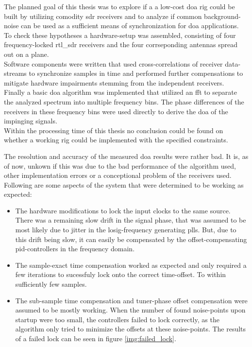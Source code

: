The planned goal of this thesis was to explore if
a a low-cost \gls{doa} rig could be built by
utilizing comodity \gls{sdr} receivers
and to analyze if common background-noise
can be used as a sufficient means of
synchronization for \gls{doa} applications. \\

To check these hypotheses a hardware-setup was
assembled, consisting of four frequency-locked
rtl\_sdr receivers and the four corrseponding
antennas spread out on a plane. \\

Software components were written that used
cross-correlations of receiver data-streams
to synchronize samples in time and
performed further compensations to
mitigate hardware impairments stemming from
the independent receivers. \\

Finally a basic \gls{doa} algorithm was implemented
that utilized an \gls{fft} to separate the
analyzed spectrum into multiple frequency bins.
The phase differences of the receivers in these
frequency bins were used directly to derive
the \acrlong{doa} of the impinging signals. \\

Within the processing time of this thesis no
conclusion could be found on whether a
working rig could be implemented with the
specified constraints.

The resolution and accuracy of the measured
\gls{doa} results were rather bad.
It is, as of now, unkown if this was due to
the bad performance of the algorithm used,
other implementation errors or a conceptional
problem of the receivers used. \\

Following are some aspects of the system that
were determined to be working as expected:

\begin{itemize}
  \item
    The hardware modifications to lock the input clocks
    to the same source. \\
    There was a remaining slow drift in
    the signal phase, that was assumed to be most likely due to jitter
    in the \acrshort{losig}-frequency generating \glspl{pll}.
    But, due to this drift being slow, it can easily be compensated by
    the offset-compensating \acrshort{pid}-controllers in the frequency domain.

  \item
    The sample-exact time compensation worked as expected and
    only required a few iterations to sucessfuly lock onto
    the correct time-offset. To within sufficiently few samples.

  \item
    The sub-sample time compensation and tuner-phase
    offset compensation were assumed to be mostly working.
    When the number of found noise-points upon startup
    were too small, the controllers failed to lock
    correctly, as the algorithm only tried to minimize the
    offsets at these noise-points.
    The results of a failed lock can be seen in figure
    \ref{img:failed_lock}.
\end{itemize}

